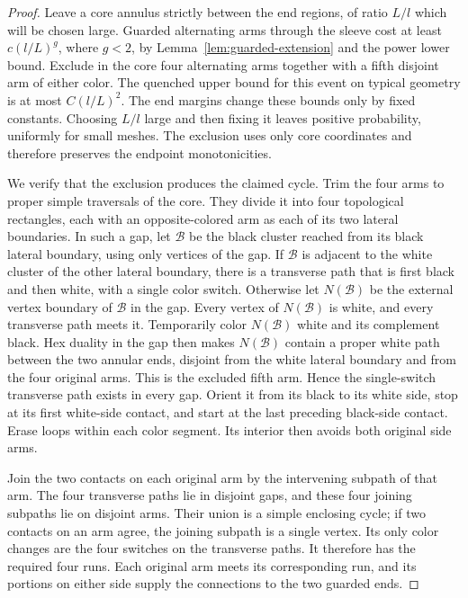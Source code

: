 \begin{proof}
Leave a core annulus strictly between the end regions, of ratio $L/l$
which will be chosen large.  Guarded alternating arms through the sleeve
cost at least $c(l/L)^g$, where $g<2$, by
Lemma~\ref{lem:guarded-extension} and the power lower bound.  Exclude in
the core four alternating arms together with a fifth disjoint arm of
either color.  The quenched upper bound for this event on typical geometry
is at most $C(l/L)^2$.  The end margins change these bounds only by fixed
constants.  Choosing $L/l$ large and then fixing it leaves positive
probability, uniformly for small meshes.  The exclusion uses only core
coordinates and therefore preserves the endpoint monotonicities.

We verify that the exclusion produces the claimed cycle.  Trim the four
arms to proper simple traversals of the core.  They divide it into four
topological rectangles, each with an opposite-colored arm as each of its
two lateral boundaries.  In such a gap, let $\mathcal B$ be the black
cluster reached from its black lateral boundary, using only vertices of
the gap.  If $\mathcal B$ is adjacent to the white cluster of the other
lateral boundary, there is a transverse path that is first black and then
white, with a single color switch.  Otherwise let $N(\mathcal B)$ be the
external vertex boundary of $\mathcal B$ in the gap.  Every vertex of
$N(\mathcal B)$ is white, and every transverse path meets it.  Temporarily
color $N(\mathcal B)$ white and its complement black.  Hex duality in the
gap then makes $N(\mathcal B)$ contain a proper white path between the two
annular ends, disjoint from the white lateral boundary and from the four
original arms.  This is the excluded fifth arm.  Hence the single-switch
transverse path exists in every gap.  Orient it from its black to its white
side, stop at its first white-side contact, and start at the last preceding
black-side contact.  Erase loops within each color segment.  Its interior
then avoids both original side arms.

Join the two contacts on each original arm by the intervening subpath of
that arm.  The four transverse paths lie in disjoint gaps, and these four
joining subpaths lie on disjoint arms.  Their union is a simple enclosing
cycle; if two contacts on an arm agree, the joining subpath is a single
vertex.  Its only color changes are the four switches on the transverse
paths.  It therefore has the required four runs.  Each original arm
meets its corresponding run, and its portions on either side supply the
connections to the two guarded ends.
\end{proof}

